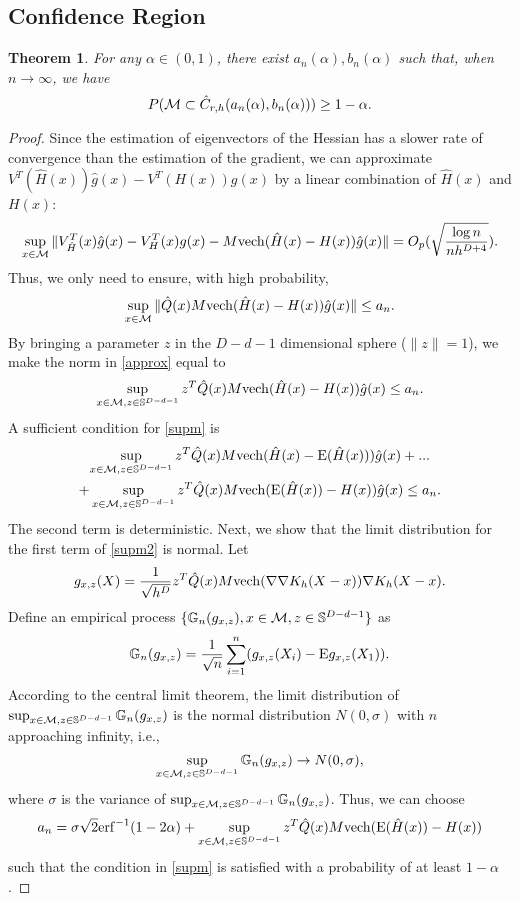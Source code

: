 \documentclass[aos,preprint]{imsart}
\newtheorem{theorem}{Theorem}[section]
\theoremstyle{remark}
\begin{document}
\begin{appendix}
\subsection{Confidence Region}
\begin{theorem}\label{confidence}
For any $\alpha\in(0,1)$, there exist $a_n(\alpha), b_n(\alpha)$ such that, when $n\rightarrow \infty$, we have
\[
P({\cal M}\subset \hat{C}_{r,h}(a_n(\alpha), b_n(\alpha)) ) \geq 1-\alpha.
\]
\end{theorem}
\begin{proof}\label{confidence_region}
Since the estimation of eigenvectors of the Hessian has a slower rate of convergence than the estimation of the gradient,
we can approximate $V^T({\hat{H}}(x))\hat{g}(x) -V^T(H(x))g(x)$ by a linear combination of $\hat{H}(x)$ and $H(x)$:
\[
\sup_{x\in \cal M} \|V^T_{\hat{H}}(x)\hat{g}(x) -V^T_H(x)g(x)-M {\rm vech}(\hat{H}(x)-H(x))\hat{g}(x)\| = O_p(\sqrt{\frac{\log n}{nh^{D+4}}}).
\]
Thus, we only need to ensure, with high probability,
\begin{equation}\label{approx}
\sup_{x\in\cal M}\|\hat{Q}(x)M {\rm vech}(\hat{H}(x)- H(x))\hat{g}(x)\|\leq a_n.
\end{equation}
By bringing a parameter $z$ in the $D-d-1$ dimensional sphere ($\|z\|=1$), we make the norm in \eqref{approx} equal to 
\begin{equation}\label{supm}
\sup_{x\in{\cal M}, z\in {\mathbb S}^{D-d-1}} z^T\hat{Q}(x)M {\rm vech}(\hat{H}(x)- H(x))\hat{g}(x) \leq a_n.
\end{equation}
A sufficient condition for \eqref{supm} is
\begin{multline}\label{supm2}
\sup_{x\in{\cal M}, z\in {\mathbb S}^{D-d-1}} z^T\hat{Q}(x)M {\rm vech}(\hat{H}(x)- {\rm E}(\hat{H}(x)))\hat{g}(x)+...\\
+\sup_{x\in{\cal M}, z\in {\mathbb S}^{D-d-1}} z^T\hat{Q}(x)M {\rm vech}({\rm E}(\hat{H}(x)) - H(x))\hat{g}(x) \leq a_n.
\end{multline}
The second term is deterministic. Next, we show that the limit distribution for the first term of \eqref{supm2} is normal. Let 
\[
g_{x,z}(X) = \frac{1}{\sqrt{h^D}} z^T\hat{Q}(x)M {\rm vech}( \nabla\nabla K_h(X-x))\nabla K_h(X-x).
\]
Define an empirical process $\{{\mathbb G}_n(g_{x,z}), x\in {\cal M}, z\in {\mathbb S}^{D-d-1}\}$ as
\[
{\mathbb G}_n(g_{x,z}) = \frac{1}{\sqrt{n}} \sum_{i=1}^n (g_{x,z}(X_i)-{\rm E}g_{x,z}(X_1)).
\]
According to the central limit theorem, the limit distribution of $\sup_{x\in {\cal M},{z \in {\mathbb S}^{D-d-1}}}{\mathbb G}_n(g_{x,z})$ is the normal distribution $N(0,\sigma)$ with $n$ approaching infinity, i.e.,  
\[
\sup_{x\in {\cal M},{z \in {\mathbb S}^{D-d-1}}}{\mathbb G}_n(g_{x,z}) \rightarrow N(0,\sigma),
\]
where $\sigma$ is the variance of $\sup_{x\in {\cal M},{z \in {\mathbb S}^{D-d-1}}}{\mathbb G}_n(g_{x,z})$.
Thus,  we can choose 
\[
a_n = \sigma\sqrt{2}{\rm erf}^{-1}(1-2\alpha) + \sup_{x\in{\cal M}, z\in {\mathbb S}^{D-d-1}} z^T\hat{Q}(x)M {\rm vech}({\rm E}(\hat{H}(x)) - H(x)) 
\]
such that the condition in \eqref{supm} is satisfied with a probability of at least $1-\alpha$.
\end{proof}


\end{appendix}
\end{document}

